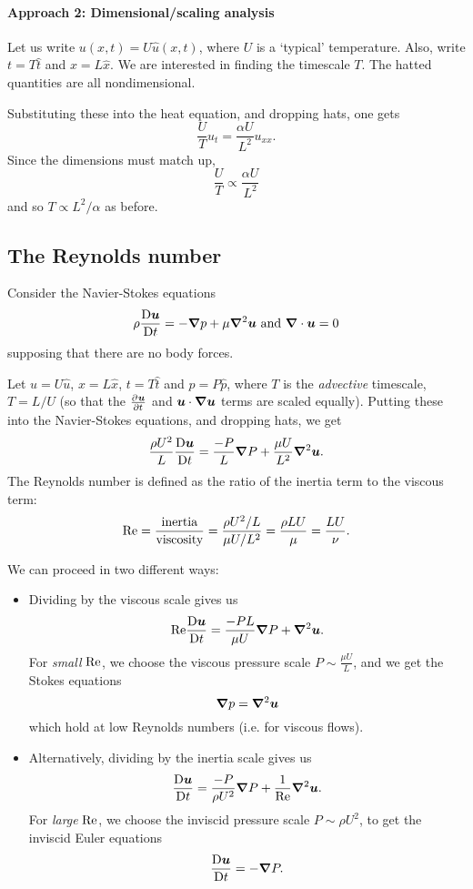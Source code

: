 \documentclass{article}
\begin{document}
\paragraph{Approach 2: Dimensional/scaling analysis} Let us write $u(x,t) = U \hat
u(x,t) $, where $U$ is a `typical' temperature. Also, write $t=T\hat{t}$ and
$x=L\hat{x}$. We are interested in finding the timescale $T$. The hatted
quantities are all nondimensional.

Substituting these into the heat equation, and dropping hats, one gets
$$ \frac{U}{T} u_t = \frac{\alpha U}{L^2} u_{xx}. $$
Since the dimensions must match up, 
$$ \frac{U}{T} \propto \frac{\alpha U}{L^2} $$
and so $T \propto L^2/\alpha$ as before.

\subsection{The Reynolds number}

Consider the Navier-Stokes equations
$$ \rho\frac{\mathrm{D}\boldsymbol{u}}{\mathrm{D}t} = -\boldsymbol{\nabla} p + \mu \boldsymbol{\nabla}^2 \boldsymbol{u} \text{ and } \boldsymbol{\nabla}\cdot\boldsymbol{u}=0 $$
supposing that there are no body forces.

Let $u = U\hat{u}$, $x = L\hat{x}$, $t = T\hat{t}$ and $p = P\hat{p}$, where $T$
is the \textit{advective} timescale, $T = L/U$ (so that the $\pd{\bs{u}}{t}$ and
$\boldsymbol{u}\cdot\boldsymbol{\nabla}\boldsymbol{u}$ terms are scaled equally). Putting these into the
Navier-Stokes equations, and dropping hats, we get
$$ \frac{\rho U^2}{L} \frac{\mathrm{D}\boldsymbol{u}}{\mathrm{D}t} = \frac{-P}{L} \boldsymbol{\nabla} P + \frac{\mu U}{L^2} \boldsymbol{\nabla}^2 \boldsymbol{u}. $$
The Reynolds number is defined as the ratio of the inertia term to the viscous term:
\begin{equation}
 \mathrm{Re} = \frac{\text{inertia}}{\text{viscosity}}  
      = \frac{\rho U^2 / L}{\mu U / L^2} 
      = \frac{\rho L U}{\mu} 
      = \frac{LU}{\nu}.
\end{equation}

We can proceed in two different ways:
\begin{itemize}
\item Dividing by the viscous scale gives us
$$ \mathrm{Re}\frac{\mathrm{D}\boldsymbol{u}}{\mathrm{D}t} = \frac{-PL}{\mu U} \boldsymbol{\nabla} P + \boldsymbol{\nabla}^2\boldsymbol{u}. $$
For \textit{small} $\mathrm{Re}$, we choose the viscous pressure scale $P\sim\frac{\mu U}{L}$, 
and we get the Stokes equations 
$$ \boldsymbol{\nabla} p = \boldsymbol{\nabla}^2 \boldsymbol{u} $$
which hold at low Reynolds numbers (i.e. for viscous flows).

\item Alternatively, dividing by the inertia scale gives us
$$ \frac{\mathrm{D}\boldsymbol{u}}{\mathrm{D}t} = \frac{-P}{\rho U^2} \boldsymbol{\nabla} P + \frac{1}{\mathrm{Re}} \boldsymbol{\nabla}^2\boldsymbol{u}. $$
For \textit{large} $\mathrm{Re}$, we choose the inviscid pressure scale $P\sim\rho U^2$,
to get the inviscid Euler equations 
$$ \frac{\mathrm{D}\boldsymbol{u}}{\mathrm{D}t} = -\boldsymbol{\nabla} P. $$
\end{itemize}
\end{document}
